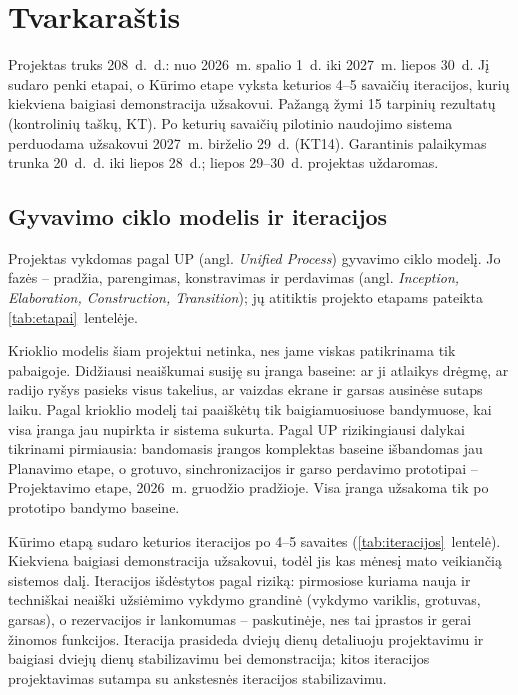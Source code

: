 
\section{Tvarkaraštis}\label{sec:tvarkarastis}

Projektas truks 208~d.~d.: nuo 2026~m. spalio 1~d. iki 2027~m. liepos
30~d. Jį sudaro penki etapai, o Kūrimo etape vyksta keturios 4--5 savaičių
iteracijos, kurių kiekviena baigiasi demonstracija užsakovui. Pažangą
žymi 15 tarpinių rezultatų (kontrolinių taškų, KT). Po keturių savaičių
pilotinio naudojimo sistema perduodama užsakovui 2027~m. birželio 29~d.
(KT14). Garantinis palaikymas trunka 20~d.~d. iki liepos 28~d.;
liepos 29--30~d. projektas uždaromas.

\subsection{Gyvavimo ciklo modelis ir iteracijos}

Projektas vykdomas pagal UP (angl. \textit{Unified Process}) gyvavimo ciklo
modelį. Jo fazės – pradžia, parengimas, konstravimas ir perdavimas (angl.
\textit{Inception, Elaboration, Construction, Transition}); jų atitiktis
projekto etapams pateikta \ref{tab:etapai}~lentelėje.

Krioklio modelis šiam projektui netinka, nes jame viskas patikrinama tik
pabaigoje. Didžiausi neaiškumai susiję su įranga baseine: ar ji atlaikys
drėgmę, ar radijo ryšys pasieks visus takelius, ar vaizdas ekrane ir garsas
ausinėse sutaps laiku. Pagal krioklio modelį tai paaiškėtų tik baigiamuosiuose
bandymuose, kai visa įranga jau nupirkta ir sistema sukurta. Pagal UP
rizikingiausi dalykai tikrinami pirmiausia: bandomasis įrangos komplektas
baseine išbandomas jau Planavimo etape, o grotuvo, sinchronizacijos ir garso
perdavimo prototipai – Projektavimo etape, 2026~m. gruodžio pradžioje. Visa
įranga užsakoma tik po prototipo bandymo baseine.

Kūrimo etapą sudaro keturios iteracijos po 4--5 savaites
(\ref{tab:iteracijos}~lentelė). Kiekviena baigiasi demonstracija užsakovui,
todėl jis kas mėnesį mato veikiančią sistemos dalį. Iteracijos išdėstytos
pagal riziką: pirmosiose kuriama nauja ir techniškai neaiški užsiėmimo
vykdymo grandinė (vykdymo variklis, grotuvas, garsas), o rezervacijos ir
lankomumas – paskutinėje, nes tai įprastos ir gerai žinomos funkcijos.
Iteracija prasideda dviejų dienų detaliuoju projektavimu ir baigiasi dviejų
dienų stabilizavimu bei demonstracija; kitos iteracijos projektavimas sutampa
su ankstesnės iteracijos stabilizavimu.

